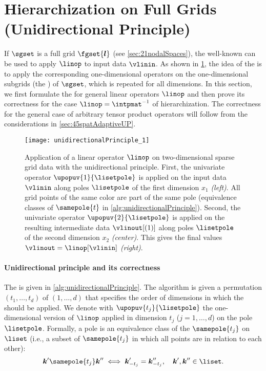 \section{Hierarchization on Full Grids (Unidirectional Principle)}
\label{sec:42fullGrids}

If $\sgset$ is a full grid $\fgset{\*l}$
(see \cref{sec:21nodalSpaces}),
the well-known \term{\up}
can be used to apply $\linop$ to input data $\vlinin$.
As shown in \cref{fig:unidirectionalPrinciple}, the idea of the \up
is to apply the corresponding one-dimensional operators on the
one-dimensional subgrids (the ) of $\sgset$,
which is repeated for all dimensions.
In this section, we first formulate the \up for
general linear operators $\linop$ and then prove its correctness for
the case $\linop = \intpmatinv$ of hierarchization.
The correctness for the general case of arbitrary tensor product operators
will follow from the considerations in \cref{sec:45spatAdaptiveUP}.

\begin{figure}
  \texttt{[image: unidirectionalPrinciple\_1]}%
  \caption[%
    Unidirectional principle%
  ]{%
    Application of a linear operator $\linop$
    on two-dimensional sparse grid data with the unidirectional principle.
    First, the univariate operator $\upopuv{1}{\lisetpole}$ is applied on
    the input data $\vlinin$
    along poles $\lisetpole$ of the first dimension $x_1$ \emph{(left)}.
    All grid points of the same color are part of the same pole
    (equivalence classes of $\samepole{t}$ in
    \cref{alg:unidirectionalPrinciple}).
    Second, the univariate operator $\upopuv{2}{\lisetpole}$ is applied on the
    resulting intermediate data $\vlinout[(1)]$
    along poles $\lisetpole$ of the second dimension $x_2$ \emph{(center)}.
    This gives the final values $\vlinout = \linop[\vlinin]$ \emph{(right)}.%
  }%
  \label{fig:unidirectionalPrinciple}%
\end{figure}

\paragraph{Unidirectional principle and its correctness}

The \up is given in \cref{alg:unidirectionalPrinciple}.
The algorithm is given a permutation $(t_1, \dotsc, t_d)$ of $(1, \dotsc, d)$
that specifies the order of dimensions in which the \up should be applied.
We denote with $\upopuv{t_j}{\lisetpole}$ the one-dimensional version of $\linop$
applied in dimension $t_j$ ($j = 1, \dotsc, d$) on the pole $\lisetpole$.
Formally, a pole is an equivalence class of the
 $\samepole{t_j}$ on $\liset$
(i.e., a subset of $\samepole{t_j}$
in which all points are in relation to each other):
\begin{equation}
  \label{eq:poleEquivalenceRelation}
  \*k' \samepole{t_j} \*k'' \iff \*k'_{-t_j} = \*k''_{-t_j},\quad
  \*k', \*k'' \in \liset.
\end{equation}

